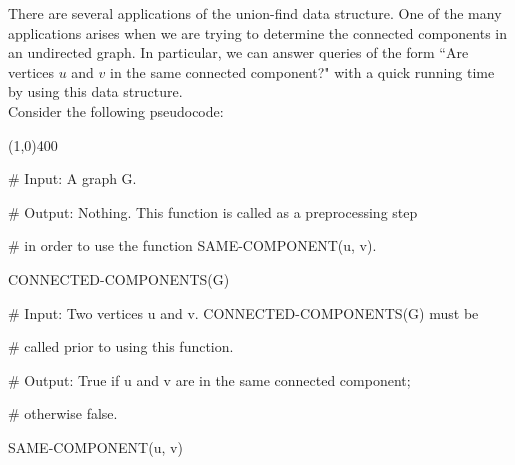 There are several applications of the union-find data structure. One of the many applications arises when we are trying to determine the connected components in an undirected graph. In particular, we can answer queries of the form ``Are vertices $u$ and $v$ in the same connected component?" with a quick running time by using this data structure. \\


Consider the following pseudocode: 


\vspace{1em}
\begin{center}
\line(1,0){400}
\end{center}

\begin{allintypewriter}
\# Input: A graph G.

\hspace{0cm}

\# Output: Nothing. This function is called as a preprocessing step 

\# in order to use the function SAME-COMPONENT(u, v).

\hspace{0.5cm}


CONNECTED-COMPONENTS(G) 

\hspace{0cm}

\# Input: Two vertices u and v. CONNECTED-COMPONENTS(G) must be 

\#  called prior to using this function.

\hspace{0cm}

\# Output: True if u and v are in the same connected component;

\# otherwise false. 

\hspace{0cm}

SAME-COMPONENT(u, v) 
\end{allintypewriter}

